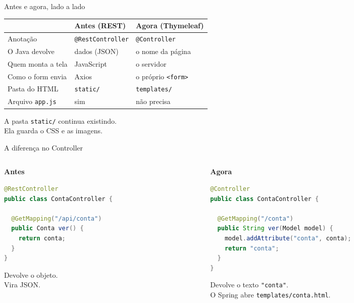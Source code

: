\documentclass[aspectratio=169,11pt]{beamer}
\begin{document}
\begin{frame}{Antes e agora, lado a lado}
  \begin{center}
  \begin{tabular}{lll}
    \toprule
     & Antes (REST) & Agora (Thymeleaf) \\
    \midrule
    Anotação & \texttt{@RestController} & \texttt{@Controller} \\
    O Java devolve & dados (JSON) & o nome da página \\
    Quem monta a tela & JavaScript & o servidor \\
    Como o form envia & Axios & o próprio \texttt{<form>} \\
    Pasta do HTML & \texttt{static/} & \texttt{templates/} \\
    Arquivo \texttt{app.js} & sim & não precisa \\
    \bottomrule
  \end{tabular}
  \end{center}

  \vspace{0.6em}
  A pasta \texttt{static/} continua existindo.\\
  Ela guarda o CSS e as imagens.
\end{frame}

\begin{frame}[fragile]{A diferença no Controller}
  \begin{columns}[T]
    \begin{column}{0.48\textwidth}
      \textbf{Antes}
\begin{lstlisting}[language=Java,basicstyle=\ttfamily\scriptsize]
@RestController
public class ContaController {

  @GetMapping("/api/conta")
  public Conta ver() {
    return conta;
  }
}
\end{lstlisting}
      Devolve o objeto.\\
      Vira JSON.
    \end{column}
    \begin{column}{0.48\textwidth}
      \textbf{Agora}
\begin{lstlisting}[language=Java,basicstyle=\ttfamily\scriptsize]
@Controller
public class ContaController {

  @GetMapping("/conta")
  public String ver(Model model) {
    model.addAttribute("conta", conta);
    return "conta";
  }
}
\end{lstlisting}
      Devolve o texto \texttt{"conta"}.\\
      O Spring abre \texttt{templates/conta.html}.
    \end{column}
  \end{columns}
\end{frame}
\end{document}
